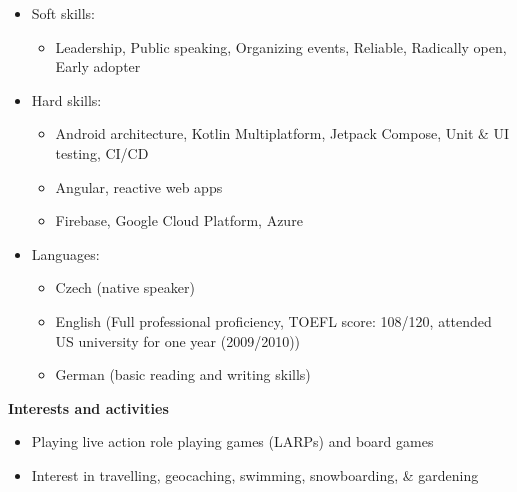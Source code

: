 \documentclass[letterpaper,11pt]{article}
\newcommand{\resitem}[1]{\item #1 \vspace{-2pt}}
\newcommand{\resheading}[1]{{\large \colorbox{mygrey}{\begin{minipage}{\textwidth}{\textbf{#1 \vphantom{p\^{E}}}}\end{minipage}}}}
\begin{document}
\begin{itemize}

	\item Soft skills:
		\begin{itemize}
			\footnotesize
			\resitem{Leadership, Public speaking, Organizing events, Reliable, Radically open, Early adopter}
		\end{itemize}	 
     \item Hard skills:
		 \begin{itemize}
	 		\footnotesize
			\resitem{Android architecture, Kotlin Multiplatform, Jetpack Compose, Unit \& UI testing, CI/CD}
                \resitem{Angular, reactive web apps}
			\resitem{Firebase, Google Cloud Platform, Azure}
		 \end{itemize} 	
	\item Languages:
		\begin{itemize}
			\footnotesize
			\resitem{Czech (native speaker)}
			\resitem{English (Full professional proficiency, TOEFL score: 108/120, attended US university for one year (2009/2010))}
			\resitem{German (basic reading and writing skills) }
		\end{itemize}			
\end{itemize}

\resheading{Interests and activities}
\begin{itemize}
	\item Playing live action role playing games (LARPs) and board games
	\item Interest in travelling, geocaching, swimming, snowboarding, \& gardening
\end{itemize}
\end{document}
